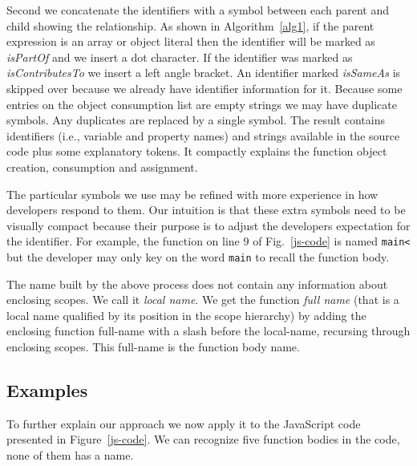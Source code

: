 \documentclass[10pt, preprint]{sigplanconf}
\begin{document}
Second we concatenate the identifiers with a symbol between each parent and child showing the relationship.  As shown in Algorithm~\ref{alg1},  
if the parent expression is an array or object literal then the identifier will be marked  as \textit{isPartOf} and we insert a dot character. If the identifier was marked as  \textit{isContributesTo} we insert a left angle bracket. An identifier marked \textit{isSameAs} is skipped over because we already have identifier information for it. Because some entries on the object consumption list are empty strings we may have duplicate symbols. Any duplicates are replaced by a single symbol. The result contains identifiers (i.e., variable and property names) and strings available in the source code plus some explanatory tokens. It compactly explains the function object creation, consumption and assignment.
 
The particular symbols we use may be refined with more experience in how developers respond to them. Our intuition is that these extra symbols need to be visually compact because their purpose is to adjust the developers expectation for the identifier. For example, the function on line 9 of Fig.~\ref{js-code} is named \texttt{main<} but the developer may only key on the word \texttt{main} to recall the function body. 

The name built by the above process does not contain any information about enclosing scopes. We call it \textit{local name}. We get the function \textit{full name} (that is a local name qualified by its position in the scope hierarchy) by adding the enclosing function full-name with a slash before the local-name, recursing through enclosing scopes. This full-name is the function body name.



\subsection{Examples}
\label{sec:examples}

To further explain our approach we now apply it to the JavaScript code presented in Figure~\ref{js-code}. We can recognize five function bodies in the code, none of them has a name. 
\end{document}
